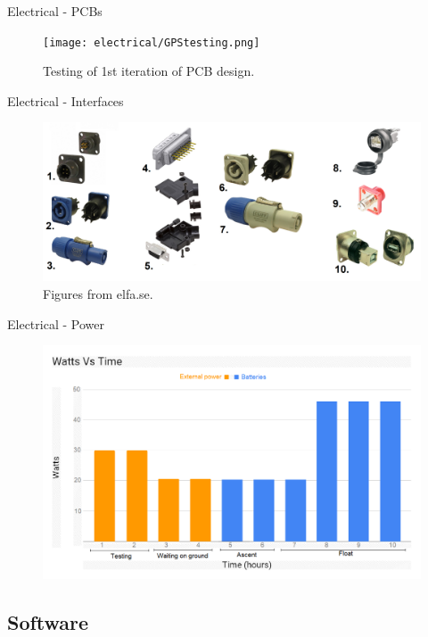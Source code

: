 \documentclass[11pt, aspectratio=169]{beamer}
\begin{document}
  	\begin{frame}[c]{Electrical - PCBs}
       \begin{figure}[H]
            \texttt{[image: electrical/GPStesting.png]}
           	\caption{Testing of 1st iteration of PCB design.}
        \end{figure}  
    \end{frame}         

	\begin{frame}[c]{Electrical - Interfaces}
   		\begin{figure}
            \includegraphics[width=.7\textwidth]{electrical/interface.png}
           	\caption{Figures from elfa.se.}
        \end{figure}
    \end{frame}
    

    
    \begin{frame}[c]{Electrical - Power}

 		\begin{figure}
           \includegraphics[width=.7\textwidth]{electrical/PowerDiagram.png}
           	
       	\end{figure} 
    
    \end{frame}

\subsection{Software}
\end{document}
